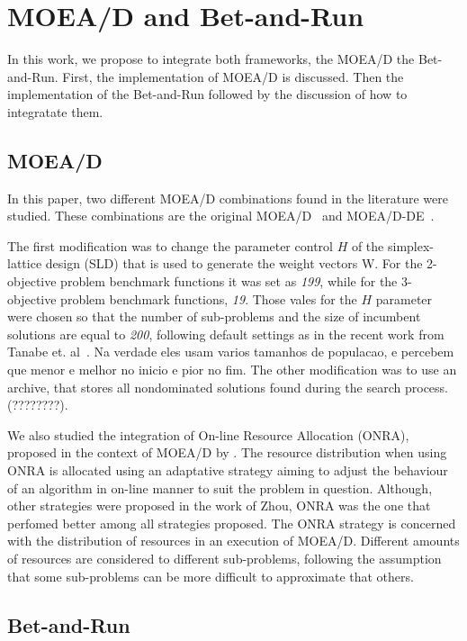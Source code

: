 \section{MOEA/D and Bet-and-Run}

In this work, we propose to integrate both frameworks, the MOEA/D the Bet-and-Run.  First, the implementation of MOEA/D is discussed. Then the implementation of the Bet-and-Run followed by the discussion of how to integratate them.

\subsection{MOEA/D}

In this paper, two different MOEA/D combinations found in the literature  were studied. These combinations are the original MOEA/D~\cite{zhang2007moea} and MOEA/D-DE~\cite{li2009multiobjective}. 

The first modification was to change the parameter control $H$ of the simplex-lattice design (SLD) that is used to generate the weight vectors W. For the 2-objective problem benchmark functions it was set as \textit{199}, while for the 3-objective problem benchmark functions, \textit{19}. Those vales for the $H$ parameter were chosen so that the number of sub-problems and the size of incumbent solutions are equal to \textit{200}, following default settings as in the recent work from Tanabe et. al~\cite{tanabe2018analysis}. Na verdade eles usam varios tamanhos de populacao, e percebem que menor e melhor no inicio e pior no fim. The other modification was to use an archive, that stores all nondominated solutions found during the search process.(????????). 

We also studied the integration of On-line Resource Allocation (ONRA), proposed in the context of MOEA/D by \cite{zhou2016all}. The resource distribution when using ONRA is allocated using an adaptative strategy aiming to adjust the behaviour of an algorithm in on-line manner to suit the problem in question. Although, other strategies were proposed in the work of Zhou, ONRA was the one that perfomed better among all strategies proposed. The ONRA strategy is concerned with the distribution of resources in an execution of MOEA/D. Different amounts of resources are considered to different sub-problems, following the assumption that some sub-problems can be more difficult to approximate that others. 

\subsection{Bet-and-Run}

